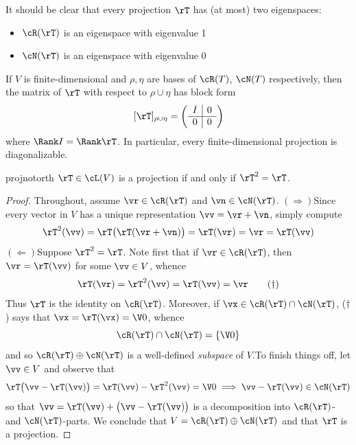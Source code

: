 It should be clear that every projection $\rT$ has (at most) two eigenspaces:
\begin{itemize}
  \item $\cR(\rT)$ is an eigenspace with eigenvalue 1
  \item $\cN(\rT)$ is an eigenspace with eigenvalue 0
\end{itemize}
If $V$ is finite-dimensional and $\rho,\eta$ are bases of $\cR(T)$, $\cN(T)$ respectively, then the matrix of $\rT$ with respect to $\rho\cup\eta$ has block form
\[[\rT]_{\rho\cup\eta} =\left(\begin{array}{c|c}
I&0\\\hline
0&0
\end{array}\right)\]
where $\Rank I=\Rank\rT$. In particular, every finite-dimensional projection is diagonalizable.
\goodbreak

\begin{lemm}{}{projnotorth}
$\rT\in\cL(V)$ is a projection if and only if $\rT^2=\rT$.
\end{lemm}

\begin{proof}
Throughout, assume $\vr\in\cR(\rT)$ and $\vn\in\cN(\rT)$.\smallbreak
$(\Rightarrow)$\quad Since every vector in $V$ has a unique representation $\vv=\vr+\vn$, simply compute
\[\rT^2(\vv)=\rT\bigl(\rT(\vr+\vn)\bigr)=\rT(\vr)=\vr=\rT(\vv)\]
$(\Leftarrow)$\quad Suppose $\rT^2=\rT$. Note first that if $\vr\in\cR(\rT)$, then $\vr=\rT(\vv)$ for some $\vv\in V$, whence
\[\rT(\vr)=\rT^2(\vv)=\rT(\vv)=\vr\tag{$\dag$}\]
Thus $\rT$ is the identity on $\cR(\rT)$. Moreover, if $\vx\in\cR(\rT)\cap\cN(\rT)$, ($\dag$) says that $\vx=\rT(\vx)=\V0$, whence
\[\cR(\rT)\cap\cN(\rT)=\{\V0\}\]
and so $\cR(\rT)\oplus\cN(\rT)$ is a well-defined \emph{subspace} of $V$.\footnotemark To finish things off, let $\vv\in V$ and observe that
\[\rT\bigl(\vv-\rT(\vv)\bigr)=\rT(\vv)-\rT^2(\vv)=\V0\implies \vv-\rT(\vv)\in\cN(\rT)\]
so that $\vv=\rT(\vv)+\bigl(\vv-\rT(\vv)\bigr)$ is a decomposition into $\cR(\rT)$- and $\cN(\rT)$-parts. We conclude that $V=\cR(\rT)\oplus\cN(\rT)$ and that $\rT$ is a projection.
\end{proof}


\goodbreak




